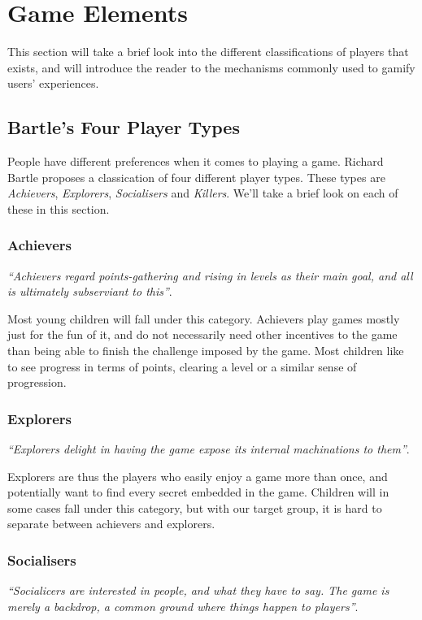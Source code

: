 \section{Game Elements}
\label{sec:gameelements}

This section will take a brief look into the different classifications of players that exists, and will introduce the reader to the mechanisms commonly used to gamify users' experiences. 

\subsection{Bartle's Four Player Types}
\label{sec:bartlesplayertypes}
People have different preferences when it comes to playing a game. Richard Bartle proposes a classication of four different player types\cite{bartle-gamers}. These types are \emph{Achievers},  \emph{Explorers},  \emph{Socialisers} and \emph{Killers}. We'll take a brief look on each of these in this section. 

\subsubsection{Achievers}
\textit{``Achievers regard points-gathering and rising in levels as their main goal, and all is ultimately subserviant to this''}\cite{bartle-gamers}. 

Most young children will fall under this category. Achievers play games mostly just for the fun of it, and do not necessarily need other incentives to the game than being able to finish the challenge imposed by the game. Most children like to see progress in terms of points, clearing a level or a similar sense of progression. 

\subsubsection{Explorers}
\textit{``Explorers delight in having the game expose its internal machinations to them''}\cite{bartle-gamers}.

Explorers are thus the players who easily enjoy a game more than once, and potentially want to find every secret embedded in the game. Children will in some cases fall under this category, but with our target group, it is hard to separate between achievers and explorers. 

\subsubsection{Socialisers}
\textit{``Socialicers are interested in people, and what they have to say. The game is merely a backdrop, a common ground where things happen to players''}\cite{bartle-gamers}. 

